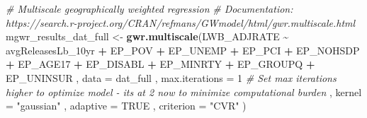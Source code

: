 \documentclass[
  12pt,
]{article}
\newenvironment{Shaded}{\begin{snugshade}}{\end{snugshade}}
\newcommand{\AttributeTok}[1]{\textcolor[rgb]{0.13,0.29,0.53}{#1}}
\newcommand{\CommentTok}[1]{\textcolor[rgb]{0.56,0.35,0.01}{\textit{#1}}}
\newcommand{\ConstantTok}[1]{\textcolor[rgb]{0.56,0.35,0.01}{#1}}
\newcommand{\DecValTok}[1]{\textcolor[rgb]{0.00,0.00,0.81}{#1}}
\newcommand{\FunctionTok}[1]{\textcolor[rgb]{0.13,0.29,0.53}{\textbf{#1}}}
\newcommand{\NormalTok}[1]{#1}
\newcommand{\OtherTok}[1]{\textcolor[rgb]{0.56,0.35,0.01}{#1}}
\newcommand{\SpecialCharTok}[1]{\textcolor[rgb]{0.81,0.36,0.00}{\textbf{#1}}}
\newcommand{\StringTok}[1]{\textcolor[rgb]{0.31,0.60,0.02}{#1}}
\begin{document}
\begin{Shaded}
\begin{Highlighting}[]
\CommentTok{\# Multiscale geographically weighted regression}
\CommentTok{\# Documentation: https://search.r{-}project.org/CRAN/refmans/GWmodel/html/gwr.multiscale.html}
\NormalTok{mgwr\_results\_dat\_full }\OtherTok{\textless{}{-}} \FunctionTok{gwr.multiscale}\NormalTok{(LWB\_ADJRATE }\SpecialCharTok{\textasciitilde{}}\NormalTok{ avgReleasesLb\_10yr }
                                               \SpecialCharTok{+}\NormalTok{ EP\_POV}
                                               \SpecialCharTok{+}\NormalTok{ EP\_UNEMP}
                                               \SpecialCharTok{+}\NormalTok{ EP\_PCI}
                                               \SpecialCharTok{+}\NormalTok{ EP\_NOHSDP}
                                               \SpecialCharTok{+}\NormalTok{ EP\_AGE17}
                                               \SpecialCharTok{+}\NormalTok{ EP\_DISABL}
                                               \SpecialCharTok{+}\NormalTok{ EP\_MINRTY}
                                               \SpecialCharTok{+}\NormalTok{ EP\_GROUPQ}
                                               \SpecialCharTok{+}\NormalTok{ EP\_UNINSUR}
\NormalTok{                                      , }\AttributeTok{data =}\NormalTok{ dat\_full}
\NormalTok{                                      , }\AttributeTok{max.iterations =} \DecValTok{1} \CommentTok{\# Set max iterations higher to optimize model {-} it\textquotesingle{}s at 2 now to minimize computational burden}
\NormalTok{                                      , }\AttributeTok{kernel =} \StringTok{"gaussian"}
\NormalTok{                                      , }\AttributeTok{adaptive =} \ConstantTok{TRUE}
\NormalTok{                                      , }\AttributeTok{criterion =} \StringTok{"CVR"}
\NormalTok{)}
\end{Highlighting}
\end{Shaded}
\end{document}
